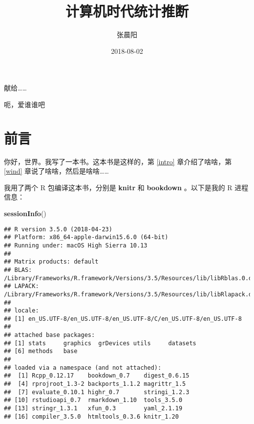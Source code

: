 \documentclass[]{ctexbook}
\title{计算机时代统计推断}
\author{张晨阳}
\date{2018-08-02}
\newenvironment{Shaded}{\begin{snugshade}}{\end{snugshade}}
\newcommand{\KeywordTok}[1]{\textcolor[rgb]{0.13,0.29,0.53}{\textbf{#1}}}
\newcommand{\NormalTok}[1]{#1}
\theoremstyle{definition}
\theoremstyle{definition}
\theoremstyle{definition}
\theoremstyle{remark}
\begin{document}
\maketitle


\thispagestyle{empty}

\begin{center}
献给……

呃，爱谁谁吧
\end{center}

\setlength{\abovedisplayskip}{-5pt}
\setlength{\abovedisplayshortskip}{-5pt}

{
\setcounter{tocdepth}{2}
\tableofcontents
}
\listoftables
\listoffigures
\chapter*{前言}


你好，世界。我写了一本书。这本书是这样的，第 \ref{intro}
章介绍了啥啥，第 \ref{wind} 章说了啥啥，然后是啥啥\ldots{}\ldots{}

我用了两个 R 包编译这本书，分别是 \textbf{knitr}
\citep{xie2015} 和 \textbf{bookdown}
\citep{R-bookdown}。以下是我的 R 进程信息：

\begin{Shaded}
\begin{Highlighting}[]
\KeywordTok{sessionInfo}\NormalTok{()}
\end{Highlighting}
\end{Shaded}

\begin{verbatim}
## R version 3.5.0 (2018-04-23)
## Platform: x86_64-apple-darwin15.6.0 (64-bit)
## Running under: macOS High Sierra 10.13
## 
## Matrix products: default
## BLAS: /Library/Frameworks/R.framework/Versions/3.5/Resources/lib/libRblas.0.dylib
## LAPACK: /Library/Frameworks/R.framework/Versions/3.5/Resources/lib/libRlapack.dylib
## 
## locale:
## [1] en_US.UTF-8/en_US.UTF-8/en_US.UTF-8/C/en_US.UTF-8/en_US.UTF-8
## 
## attached base packages:
## [1] stats     graphics  grDevices utils     datasets 
## [6] methods   base     
## 
## loaded via a namespace (and not attached):
##  [1] Rcpp_0.12.17    bookdown_0.7    digest_0.6.15  
##  [4] rprojroot_1.3-2 backports_1.1.2 magrittr_1.5   
##  [7] evaluate_0.10.1 highr_0.7       stringi_1.2.3  
## [10] rstudioapi_0.7  rmarkdown_1.10  tools_3.5.0    
## [13] stringr_1.3.1   xfun_0.3        yaml_2.1.19    
## [16] compiler_3.5.0  htmltools_0.3.6 knitr_1.20
\end{verbatim}
\end{document}
